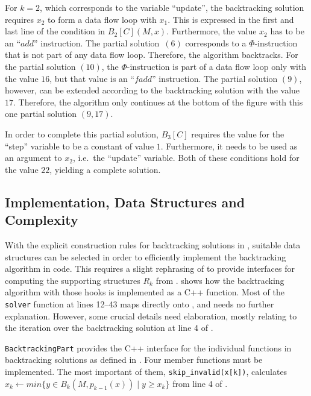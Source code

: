     For $k=2$, which corresponds to the variable ``update'', the backtracking
    solution requires $x_2$ to form a data flow loop with $x_1$.
    This is expressed  in the first and last line of the condition in
    $B_2[C](M,x)$.
    Furthermore, the value $x_2$ has to be an ``$add$'' instruction.
    The partial solution~$(6)$ corresponds to a $\Phi$-instruction that is not
    part of any data flow loop.
    Therefore, the algorithm backtracks.
    For the partial solution $(10)$, the $\Phi$-instruction is part of a data
    flow loop only with the value $16$, but that value is an ``$fadd$''
    instruction.
    The partial solution $(9)$, however, can be extended according to the
    backtracking solution with the value $17$.
    Therefore, the algorithm only continues at the bottom of the figure with
    this one partial solution $(9,17)$.

    In order to complete this partial solution, $B_3[C]$ requires the value for
    the ``step'' variable to be a constant of value $1$.
    Furthermore, it needs to be used as an argument to $x_2$, i.e.\ the
    ``update'' variable.
    Both of these conditions hold for the value $22$, yielding a complete
    solution.

\subsection{Implementation, Data Structures and Complexity}
\label{subsec:impl}

\begin{figure}[p]
    
\end{figure}

    With the explicit construction rules for backtracking solutions in
    , suitable data structures
    can be selected in order to efficiently implement the
    backtracking algorithm in code.
    This requires a slight rephrasing of  to provide
    interfaces for computing the supporting structures $R_k$ from
    .
     shows how the backtracking algorithm with those hooks is
    implemented as a C++ function.
    Most of the \texttt{solver} function at lines 12--43 maps directly onto
    , and needs no further explanation.
    However, some crucial details need elaboration, mostly relating to the
    iteration over the backtracking solution at line 4 of .

    {\tt BacktrackingPart} provides the C++ interface for the individual
    functions in backtracking solutions as defined in .
    Four member functions must be implemented.
    The most important of them, \texttt{skip\_invalid(x[k])}, calculates
    $x_k\gets min\{y\in B_k(M,p_{k-1}(x))\mid y\geq x_k\}$
    from line 4 of .


